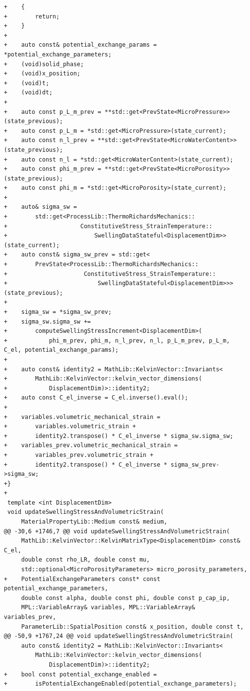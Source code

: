 \documentclass[10pt]{article}
\begin{document}
\begin{lstlisting}
+    {
+        return;
+    }
+
+    auto const& potential_exchange_params = *potential_exchange_parameters;
+    (void)solid_phase;
+    (void)x_position;
+    (void)t;
+    (void)dt;
+
+    auto const p_L_m_prev = **std::get<PrevState<MicroPressure>>(state_previous);
+    auto const p_L_m = *std::get<MicroPressure>(state_current);
+    auto const n_l_prev = **std::get<PrevState<MicroWaterContent>>(state_previous);
+    auto const n_l = *std::get<MicroWaterContent>(state_current);
+    auto const phi_m_prev = **std::get<PrevState<MicroPorosity>>(state_previous);
+    auto const phi_m = *std::get<MicroPorosity>(state_current);
+
+    auto& sigma_sw =
+        std::get<ProcessLib::ThermoRichardsMechanics::
+                     ConstitutiveStress_StrainTemperature::
+                         SwellingDataStateful<DisplacementDim>>(state_current);
+    auto const& sigma_sw_prev = std::get<
+        PrevState<ProcessLib::ThermoRichardsMechanics::
+                      ConstitutiveStress_StrainTemperature::
+                          SwellingDataStateful<DisplacementDim>>>(state_previous);
+
+    sigma_sw = *sigma_sw_prev;
+    sigma_sw.sigma_sw +=
+        computeSwellingStressIncrement<DisplacementDim>(
+            phi_m_prev, phi_m, n_l_prev, n_l, p_L_m_prev, p_L_m, C_el, potential_exchange_params);
+
+    auto const& identity2 = MathLib::KelvinVector::Invariants<
+        MathLib::KelvinVector::kelvin_vector_dimensions(
+            DisplacementDim)>::identity2;
+    auto const C_el_inverse = C_el.inverse().eval();
+
+    variables.volumetric_mechanical_strain =
+        variables.volumetric_strain +
+        identity2.transpose() * C_el_inverse * sigma_sw.sigma_sw;
+    variables_prev.volumetric_mechanical_strain =
+        variables_prev.volumetric_strain +
+        identity2.transpose() * C_el_inverse * sigma_sw_prev->sigma_sw;
+}
+
 template <int DisplacementDim>
 void updateSwellingStressAndVolumetricStrain(
     MaterialPropertyLib::Medium const& medium,
@@ -30,6 +1746,7 @@ void updateSwellingStressAndVolumetricStrain(
     MathLib::KelvinVector::KelvinMatrixType<DisplacementDim> const& C_el,
     double const rho_LR, double const mu,
     std::optional<MicroPorosityParameters> micro_porosity_parameters,
+    PotentialExchangeParameters const* const potential_exchange_parameters,
     double const alpha, double const phi, double const p_cap_ip,
     MPL::VariableArray& variables, MPL::VariableArray& variables_prev,
     ParameterLib::SpatialPosition const& x_position, double const t,
@@ -50,9 +1767,24 @@ void updateSwellingStressAndVolumetricStrain(
     auto const& identity2 = MathLib::KelvinVector::Invariants<
         MathLib::KelvinVector::kelvin_vector_dimensions(
             DisplacementDim)>::identity2;
+    bool const potential_exchange_enabled =
+        isPotentialExchangeEnabled(potential_exchange_parameters);
 

\end{lstlisting}
\end{document}
